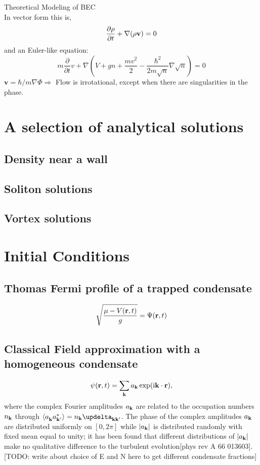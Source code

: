 \begin{chapter}{\label{cha:theoretical_model}Theoretical Modeling of BEC}
\begin{equation*}
	\end{equation*}
	In vector form this is,
	\begin{equation}
		\frac{\partial \rho}{\partial t} + \nabla(\rho{\bf v}) = 0
		\label{eq:MTcont}
	\end{equation}
	and an Euler-like equation:
	\begin{equation}
		m\frac{\partial}{\partial t} v + \nabla\left(V + gn + \frac{mv^2}{2} - \frac{\hbar^2}{2m\sqrt{n}}\nabla\sqrt{n}\right) = 0
		\label{eq:MTeuler}
	\end{equation}
	$\mathbf{v} = \hbar/m\nabla\Phi \Rightarrow$ Flow is irrotational, except when there are singularities in the phase.
\section{\label{section:solutions} A selection of analytical solutions}
	\subsection{\label{section:wall} Density near a wall}
	\subsection{\label{section:soliton} Soliton solutions}
	\subsection{\label{section:vortices} Vortex solutions}
\section{\label{section:inital} Initial Conditions}
	\subsection{\label{section:tftrap} Thomas Fermi profile of a trapped condensate}
	\begin{equation}
	\sqrt{\frac{\mu - V({\bf r},t)}{g}} =  \Psi({\bf r},t)
	\label{eq:TF}
	\end{equation}
	\subsection{\label{section:cfield} Classical Field approximation with a homogeneous condensate}
		\begin{equation}
		\psi({\bf r},t) = \sum_{\bf k} a_{\bf k} \exp (\mathrm{i}{\bf k}\cdot{\bf r}),
		\label{eq:cFieldIC}
		\end{equation}
		where the complex Fourier amplitudes $a_{\bf k}$ are related to the occupation numbers $n_{\bf k}$ through $\braket{a_{\bf k}^{\,}a_{\bf k'}^*} = n_{\bf k}\updelta_{\bf kk'}$. The phase of the complex amplitudes $a_{\bf k}$ are distributed uniformly on $[0,2\pi]$ while $|a_{\bf k}|$ is distributed randomly with fixed mean equal to unity; it has been found that different distributions of $|a_{\bf k}|$ make no qualitative difference to the turbulent evolution[phys rev A 66 013603]. [TODO: write about choice of E and N here to get different condensate fractions]


\end{chapter}

